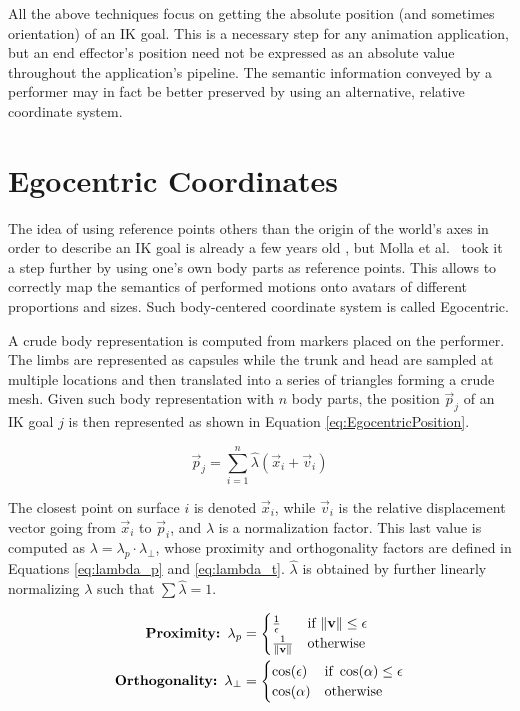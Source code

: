 All the above techniques focus on getting the absolute position (and sometimes orientation) of an IK goal. This is a necessary step for any animation application, but an end effector's position need not be expressed as an absolute value throughout the application's pipeline. The semantic information conveyed by a performer may in fact be better preserved by using an alternative, relative coordinate system.

\section{Egocentric Coordinates}
\label{sec:egocentric}

The idea of using reference points others than the origin of the world's axes in order to describe an IK goal is already a few years old \cite{al2013relationship}, but Molla et al.\ \cite{molla2017egocentric,molla2016precise} took it a step further by using one's own body parts as reference points. This allows to correctly map the semantics of performed motions onto avatars of different proportions and sizes. Such body-centered coordinate system is called Egocentric.

A crude body representation is computed from markers placed on the performer. The limbs are represented as capsules while the trunk and head are sampled at multiple locations and then translated into a series of triangles forming a crude mesh. Given such body representation with $n$ body parts, the position $\vec{p}_j$ of an IK goal $j$ is then represented as shown in Equation \ref{eq:EgocentricPosition}.

\begin{equation}
\label{eq:EgocentricPosition}
\vec{p}_j = \displaystyle\sum_{i=1}^{n} \hat{\lambda}(\vec{x}_i + \vec{v}_i)
\end{equation}

The closest point on surface $i$ is denoted $\vec{x}_i$, while $\vec{v}_i$ is the relative displacement vector going from $\vec{x}_i$ to $\vec{p}_i$, and $\lambda $ is a normalization factor. This last value is computed as $\lambda = \lambda_p \cdot \lambda_\perp$, whose proximity and orthogonality factors are defined in Equations \ref{eq:lambda_p} and \ref{eq:lambda_t}. $\hat{\lambda}$ is obtained by further linearly normalizing $\lambda$ such that $\sum \hat{\lambda} = 1$.

\begin{align}
    \label{eq:lambda_p}
    \textbf{Proximity: } \lambda_p &=
    \begin{cases}
        \frac{1}{\epsilon}          &\text{if } \lVert\mathbf{v}\rVert \leq \epsilon\\
        \frac{1}{\lVert\mathbf{v}\rVert}    &\text{otherwise}
    \end{cases}
    \\
    \label{eq:lambda_t}
    \textbf{Orthogonality: } \lambda_\perp &=
    \begin{cases}
        \cos(\epsilon)      &\text{if } \cos(\alpha) \leq \epsilon\\
        \cos(\alpha)        &\text{otherwise}
    \end{cases}
\end{align}

